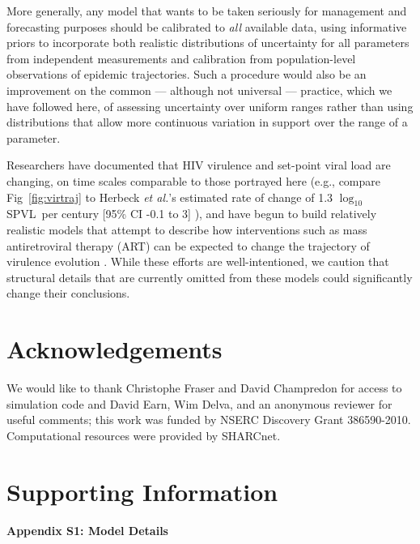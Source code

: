 \documentclass[10pt,letterpaper]{article}
\renewcommand{\figurename}{Fig}
\newcommand{\Lspvl}{$\log_{10}$ SPVL}
\newcommand{\etal}{\textit{et al.}}
\begin{document}
More generally, any model that wants to be
taken seriously for management and forecasting purposes should
be calibrated to \emph{all} available data, using informative
priors to incorporate both realistic distributions of uncertainty
for all parameters from independent measurements \cite{elderd_uncertainty_2006}
and calibration from population-level observations of epidemic
trajectories. Such a procedure would also be an improvement on the common --- although not universal --- %
practice, which we have followed here,
of assessing uncertainty over uniform ranges rather than
using distributions that allow more continuous variation in support over
the range of a parameter.

Researchers have documented that HIV virulence and set-point viral
load are changing, on time scales comparable to those portrayed here
(e.g., compare \figurename~\ref{fig:virtraj} to Herbeck \etal's
estimated rate of change of 1.3 \Lspvl\ per century [95\% CI -0.1 to
  3] \cite{herbeck_is_2012}), and have begun to build relatively realistic models that
attempt to describe how interventions such as mass antiretroviral
therapy (ART) can be expected to change the trajectory of virulence
evolution \cite{payne_impact_2014,roberts2015impact,herbeck_evolution_2016}.  While these
efforts are well-intentioned, we caution that 
structural details that are currently omitted from these models
could significantly change their conclusions.

\section*{Acknowledgements}
We would like to thank Christophe Fraser and
David Champredon for access to simulation code
and David Earn, Wim Delva, and an anonymous reviewer for useful comments;
this work was funded by NSERC Discovery Grant 386590-2010.
Computational resources were provided by SHARCnet.

\section*{Supporting Information}

\paragraph*{Appendix S1: Model Details}
\label{S1_Appendix}
\end{document}
